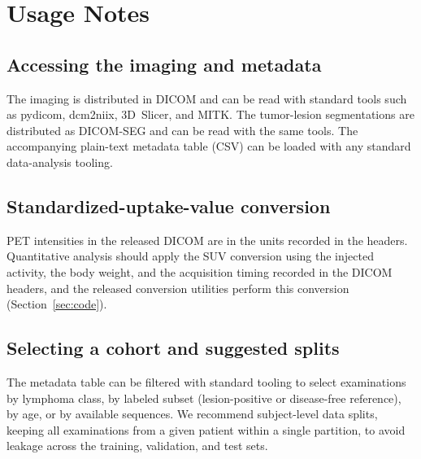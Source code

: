 
\section*{Usage Notes}\label{sec:usage}

\subsection*{Accessing the imaging and metadata}\label{subsec:access}
The imaging is distributed in DICOM and can be read with standard tools such as pydicom, dcm2niix, 3D~Slicer, and MITK.
The tumor-lesion segmentations are distributed as DICOM-SEG and can be read with the same tools.
The accompanying plain-text metadata table (CSV) can be loaded with any standard data-analysis tooling.

\subsection*{Standardized-uptake-value conversion}\label{subsec:suv}
PET intensities in the released DICOM are in the units recorded in the headers.
Quantitative analysis should apply the SUV conversion using the injected activity, the body weight, and the acquisition timing recorded in the DICOM headers, and the released conversion utilities perform this conversion (Section~\ref{sec:code}).

\subsection*{Selecting a cohort and suggested splits}\label{subsec:query}
The metadata table can be filtered with standard tooling to select examinations by lymphoma class, by labeled subset (lesion-positive or disease-free reference), by age, or by available sequences.
We recommend subject-level data splits, keeping all examinations from a given patient within a single partition, to avoid leakage across the training, validation, and test sets.

